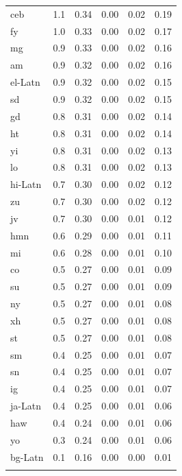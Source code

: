 \documentclass{article} %
\begin{document}
\begin{table}[t]
\begin{center}
{\begin{tabular}{lrrrrr}
ceb     & 1.1 & 0.34 & 0.00 & 0.02 & 0.19 \\
fy      & 1.0 & 0.33 & 0.00 & 0.02 & 0.17 \\
mg      & 0.9 & 0.33 & 0.00 & 0.02 & 0.16 \\
am      & 0.9 & 0.32 & 0.00 & 0.02 & 0.16 \\
el-Latn & 0.9 & 0.32 & 0.00 & 0.02 & 0.15 \\
sd      & 0.9 & 0.32 & 0.00 & 0.02 & 0.15 \\
gd      & 0.8 & 0.31 & 0.00 & 0.02 & 0.14 \\
ht      & 0.8 & 0.31 & 0.00 & 0.02 & 0.14 \\
yi      & 0.8 & 0.31 & 0.00 & 0.02 & 0.13 \\
lo      & 0.8 & 0.31 & 0.00 & 0.02 & 0.13 \\
hi-Latn & 0.7 & 0.30 & 0.00 & 0.02 & 0.12 \\
zu      & 0.7 & 0.30 & 0.00 & 0.02 & 0.12 \\
jv      & 0.7 & 0.30 & 0.00 & 0.01 & 0.12 \\
hmn     & 0.6 & 0.29 & 0.00 & 0.01 & 0.11 \\
mi      & 0.6 & 0.28 & 0.00 & 0.01 & 0.10 \\
co      & 0.5 & 0.27 & 0.00 & 0.01 & 0.09 \\
su      & 0.5 & 0.27 & 0.00 & 0.01 & 0.09 \\
ny      & 0.5 & 0.27 & 0.00 & 0.01 & 0.08 \\
xh      & 0.5 & 0.27 & 0.00 & 0.01 & 0.08 \\
st      & 0.5 & 0.27 & 0.00 & 0.01 & 0.08 \\
sm      & 0.4 & 0.25 & 0.00 & 0.01 & 0.07 \\
sn      & 0.4 & 0.25 & 0.00 & 0.01 & 0.07 \\
ig      & 0.4 & 0.25 & 0.00 & 0.01 & 0.07 \\
ja-Latn & 0.4 & 0.25 & 0.00 & 0.01 & 0.06 \\
haw     & 0.4 & 0.24 & 0.00 & 0.01 & 0.06 \\
yo      & 0.3 & 0.24 & 0.00 & 0.01 & 0.06 \\
bg-Latn & 0.1 & 0.16 & 0.00 & 0.00 & 0.01 \\
  & & & & & \\
\bottomrule
\end{tabular}
}
\end{center}
\end{table}
\end{document}
